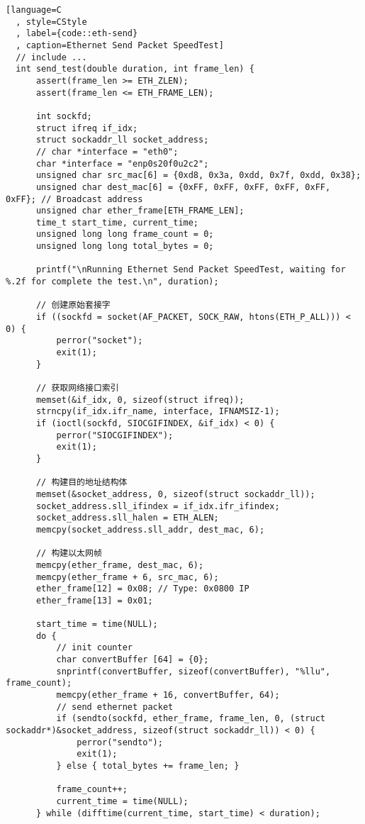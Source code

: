 \begin{lstlisting}[language=C
  , style=CStyle
  , label={code::eth-send}
  , caption=Ethernet Send Packet SpeedTest]
  // include ...
  int send_test(double duration, int frame_len) {
      assert(frame_len >= ETH_ZLEN);
      assert(frame_len <= ETH_FRAME_LEN);
  
      int sockfd;
      struct ifreq if_idx;
      struct sockaddr_ll socket_address;
      // char *interface = "eth0";
      char *interface = "enp0s20f0u2c2";
      unsigned char src_mac[6] = {0xd8, 0x3a, 0xdd, 0x7f, 0xdd, 0x38};
      unsigned char dest_mac[6] = {0xFF, 0xFF, 0xFF, 0xFF, 0xFF, 0xFF}; // Broadcast address
      unsigned char ether_frame[ETH_FRAME_LEN];
      time_t start_time, current_time;
      unsigned long long frame_count = 0;
      unsigned long long total_bytes = 0;
  
      printf("\nRunning Ethernet Send Packet SpeedTest, waiting for %.2f for complete the test.\n", duration);
  
      // 创建原始套接字
      if ((sockfd = socket(AF_PACKET, SOCK_RAW, htons(ETH_P_ALL))) < 0) {
          perror("socket");
          exit(1);
      }
  
      // 获取网络接口索引
      memset(&if_idx, 0, sizeof(struct ifreq));
      strncpy(if_idx.ifr_name, interface, IFNAMSIZ-1);
      if (ioctl(sockfd, SIOCGIFINDEX, &if_idx) < 0) {
          perror("SIOCGIFINDEX");
          exit(1);
      }
  
      // 构建目的地址结构体
      memset(&socket_address, 0, sizeof(struct sockaddr_ll));
      socket_address.sll_ifindex = if_idx.ifr_ifindex;
      socket_address.sll_halen = ETH_ALEN;
      memcpy(socket_address.sll_addr, dest_mac, 6);
  
      // 构建以太网帧
      memcpy(ether_frame, dest_mac, 6);
      memcpy(ether_frame + 6, src_mac, 6);
      ether_frame[12] = 0x08; // Type: 0x0800 IP
      ether_frame[13] = 0x01;
  
      start_time = time(NULL);
      do {
          // init counter 
          char convertBuffer [64] = {0};
          snprintf(convertBuffer, sizeof(convertBuffer), "%llu", frame_count);
          memcpy(ether_frame + 16, convertBuffer, 64);
          // send ethernet packet
          if (sendto(sockfd, ether_frame, frame_len, 0, (struct sockaddr*)&socket_address, sizeof(struct sockaddr_ll)) < 0) {
              perror("sendto");
              exit(1);
          } else { total_bytes += frame_len; }
  
          frame_count++;
          current_time = time(NULL);
      } while (difftime(current_time, start_time) < duration);
  

\end{lstlisting}
